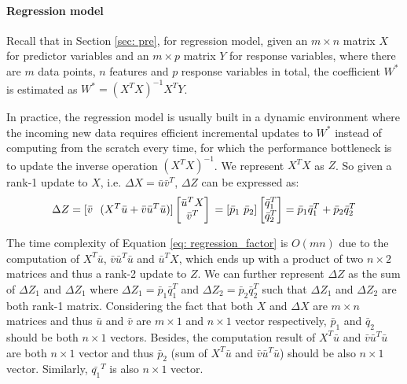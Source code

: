\paragraph{Regression model}
Recall that in Section \ref{sec: pre}, for regression model, given an $m \times n$ matrix $X$ for predictor variables and an $m \times p$ matrix $Y$ for response variables, where there are $m$ data points, $n$ features and $p$ response variables in total, the coefficient $W^*$ is estimated as $W^* = (X^TX)^{-1}X^TY$.

In practice, the regression model is usually built in a dynamic environment where the incoming new data requires efficient incremental updates to $W^*$ instead of computing from the scratch every time, for which the performance bottleneck is to update the inverse operation $(X^TX)^{-1}$. We represent $X^TX$ as $Z$. So given a rank-1 update to $X$, i.e. $\Delta X = \bar{u}\bar{v}^T$, $\Delta Z$ can be expressed as:
\begin{equation}\label{eq: regression_factor}
    \Delta Z = [\bar{v}\ \ (X^T\bar{u} + \bar{v}\bar{u}^T\bar{u})]\begin{bmatrix}
    \bar{u}^T X  \\
    \bar{v}^T  
\end{bmatrix}\\
=[\bar{p}_1\ \bar{p}_2]\begin{bmatrix}
    \bar{q}^T_1  \\
    \bar{q}^T_2  
\end{bmatrix}=\bar{p}_1\bar{q}_1^T + \bar{p}_2\bar{q}_2^T
\end{equation}

The time complexity of Equation \ref{eq: regression_factor} is $O(mn)$ due to the computation of $X^T\bar{u}$, $\bar{v}\bar{u}^T\bar{u}$ and $\bar{u}^TX$, which ends up with a product of two $n\times 2$ matrices and thus a rank-2 update to $Z$. We can further represent $\Delta Z$ as the sum of $\Delta Z_1$ and $\Delta Z_1$ where $\Delta Z_1 = \bar{p}_1\bar{q}_1^T$ and $\Delta Z_2 = \bar{p}_2\bar{q}_2^T$ such that $\Delta Z_1$ and $\Delta Z_2$ are both rank-1 matrix. Considering the fact that both $X$ and $\Delta X$ are $m \times n$ matrices and thus $\bar{u}$ and $\bar{v}$ are $m \times 1$ and $n \times 1$ vector respectively, $\bar{p}_1$ and $\bar{q}_2$ should be both $n \times 1$ vectors. Besides, the computation result of $X^T\bar{u}$ and $\bar{v}\bar{u}^T\bar{u}$ are both $n \times 1$ vector and thus $\bar{p}_2$ (sum of $X^T\bar{u}$ and $\bar{v}\bar{u}^T\bar{u}$) should be also $n \times 1$ vector. Similarly, $\bar{q_1}^T$ is also $n \times 1$ vector.

